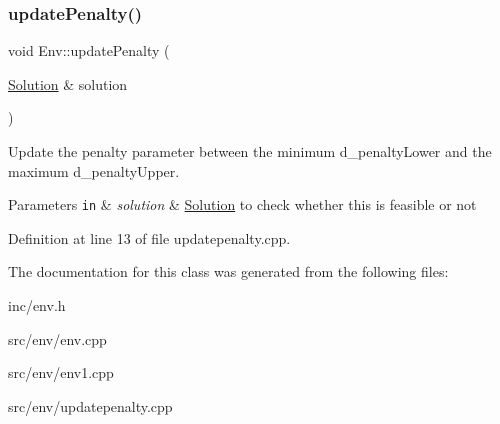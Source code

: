 \subsubsection{\texorpdfstring{update\+Penalty()}{updatePenalty()}}
{\footnotesize\ttfamily void Env\+::update\+Penalty (\begin{DoxyParamCaption}\item[{\hyperlink{class_solution}{Solution} \&}]{solution }\end{DoxyParamCaption})}



Update the penalty parameter between the minimum d\+\_\+penalty\+Lower and the maximum d\+\_\+penalty\+Upper. 


\begin{DoxyParams}[1]{Parameters}
\mbox{\tt in}  & {\em solution} & \hyperlink{class_solution}{Solution} to check whether this is feasible or not \\
\hline
\end{DoxyParams}


Definition at line 13 of file updatepenalty.\+cpp.



The documentation for this class was generated from the following files\+:\begin{DoxyCompactItemize}
\item 
inc/env.\+h\item 
src/env/env.\+cpp\item 
src/env/env1.\+cpp\item 
src/env/updatepenalty.\+cpp\end{DoxyCompactItemize}

